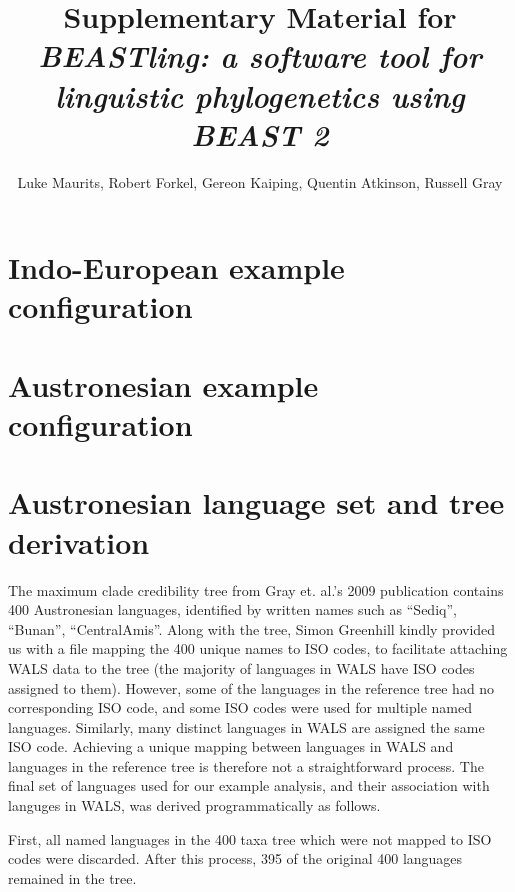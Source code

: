 \documentclass[article,10pt]{scrartcl}
\begin{document}
\title{Supplementary Material for \emph{BEASTling: a software tool for linguistic phylogenetics using BEAST 2}}
\author{Luke Maurits, Robert Forkel, Gereon Kaiping, Quentin Atkinson, Russell Gray}
\maketitle

\section{Indo-European example configuration}

\begin{alltt}

\end{alltt}

\section{Austronesian example configuration}

\begin{alltt}

\end{alltt}

\section{Austronesian language set and tree derivation}

The maximum clade credibility tree from Gray et. al.'s 2009 publication contains 400 Austronesian languages, identified by written names such as ``Sediq'', ``Bunan'', ``CentralAmis''.  Along with the tree, Simon Greenhill kindly provided us with a file mapping the 400 unique names to ISO codes, to facilitate attaching WALS data to the tree (the majority of languages in WALS have ISO codes assigned to them).  However, some of the languages in the reference tree had no corresponding ISO code, and some ISO codes were used for multiple named languages.  Similarly, many distinct languages in WALS are assigned the same ISO code.  Achieving a unique mapping between languages in WALS and languages in the reference tree is therefore not a straightforward process.  The final set of languages used for our example analysis, and their association with languges in WALS, was derived programmatically as follows.

First, all named languages in the 400 taxa tree which were not mapped to ISO codes were discarded.  After this process, 395 of the original 400 languages remained in the tree.
\end{document}
